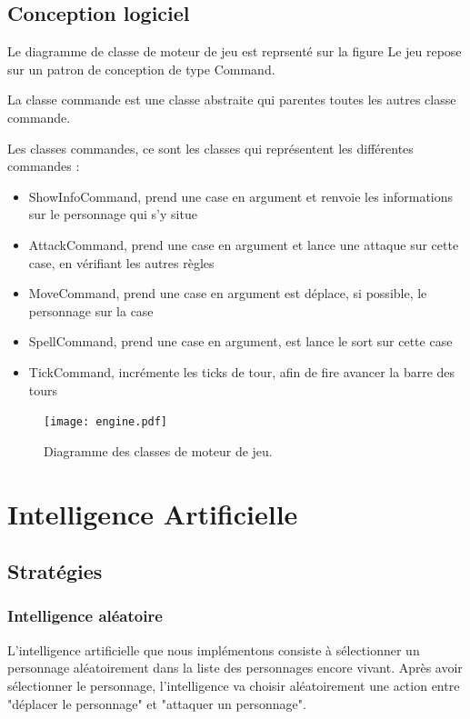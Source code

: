 \documentclass[a4paper,12pt]{article}
\begin{document}
\clearpage
\subsection{Conception logiciel}

Le diagramme de classe de moteur de jeu est reprsenté sur la figure %
Le jeu repose sur un patron de conception de type Command.

La classe commande est une classe abstraite qui parentes toutes les autres classe commande.

Les classes commandes, ce sont les classes qui représentent les différentes commandes :

\begin{itemize}
  \item ShowInfoCommand, prend une case en argument et renvoie les informations sur le personnage qui s'y situe 
  \item AttackCommand, prend une case en argument et lance une attaque sur cette case, en vérifiant les autres règles
  \item MoveCommand, prend une case en argument est déplace, si possible, le personnage sur la case
  \item SpellCommand, prend une case en argument, est lance le sort sur cette case 
  \item TickCommand, incrémente les ticks de tour, afin de fire avancer la barre des tours
\end{itemize}


\begin{landscape}
\begin{figure}[p]
\texttt{[image: engine.pdf]}
\caption{\label{uml:engine}Diagramme des classes de moteur de jeu.} 
\end{figure}
\end{landscape}


\section{Intelligence Artificielle}

\subsection{Stratégies}
\subsubsection{Intelligence aléatoire}
L'intelligence artificielle que nous implémentons consiste à sélectionner un personnage aléatoirement dans la liste des personnages encore vivant. Après avoir sélectionner le personnage, l'intelligence va choisir aléatoirement une action entre "déplacer le personnage" et "attaquer un personnage".\\
\end{document}
